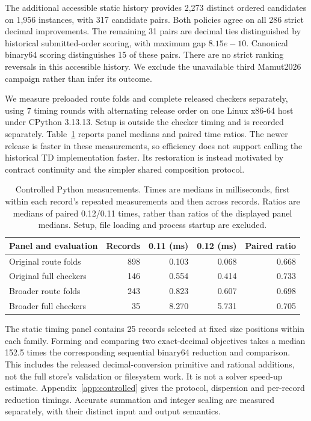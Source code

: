 The additional accessible static history provides 2,273 distinct ordered candidates on 1,956 instances, with 317 candidate pairs. Both policies agree on all 286 strict decimal improvements. The remaining 31 pairs are decimal ties distinguished by historical submitted-order scoring, with maximum gap $8.15e-10$. Canonical binary64 scoring distinguishes 15 of these pairs. There are no strict ranking reversals in this accessible history. We exclude the unavailable third Mamut2026 campaign rather than infer its outcome.

We measure preloaded route folds and complete released checkers separately, using 7 timing rounds with alternating release order on one Linux x86-64 host under CPython 3.13.13. Setup is outside the checker timing and is recorded separately. Table~\ref{tab:controlled-td} reports panel medians and paired time ratios. The newer release is faster in these measurements, so efficiency does not support calling the historical TD implementation faster. Its restoration is instead motivated by contract continuity and the simpler shared composition protocol.

\begin{table}[htbp]
\centering
\caption{Controlled Python measurements. Times are medians in milliseconds, first within each record's repeated measurements and then across records. Ratios are medians of paired 0.12/0.11 times, rather than ratios of the displayed panel medians. Setup, file loading and process startup are excluded.}\label{tab:controlled-td}
\begin{tabular}{lrrrr}
\toprule
Panel and evaluation & Records & 0.11 (ms) & 0.12 (ms) & Paired ratio\\
\midrule
Original route folds & 898 & 0.103 & 0.068 & 0.668 \\
Original full checkers & 146 & 0.554 & 0.414 & 0.733 \\
Broader route folds & 243 & 0.823 & 0.607 & 0.698 \\
Broader full checkers & 35 & 8.270 & 5.731 & 0.705 \\
\bottomrule
\end{tabular}
\end{table}

The static timing panel contains 25 records selected at fixed size positions within each family. Forming and comparing two exact-decimal objectives takes a median 152.5 times the corresponding sequential binary64 reduction and comparison. This includes the released decimal-conversion primitive and rational additions, not the full store's validation or filesystem work. It is not a solver speed-up estimate. Appendix~\ref{app:controlled} gives the protocol, dispersion and per-record reduction timings. Accurate summation and integer scaling are measured separately, with their distinct input and output semantics.

